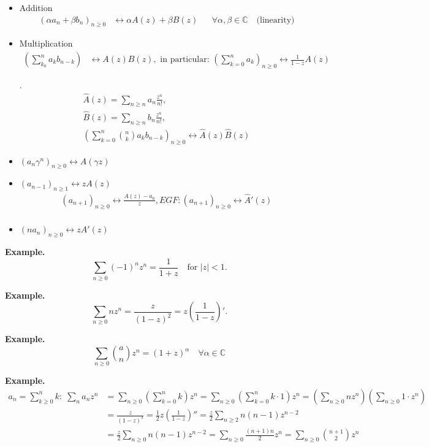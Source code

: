 \begin{itemize}
\item Addition
\begin{align*}
    (\alpha a_n + \beta b_n)_{n≥0}
        &\leftrightarrow \alpha A(z) + \beta B(z)
        &&\forall \alpha, \beta \in \mathbb{C}
        \quad\text{(linearity)}
\end{align*}
\item Multiplication
\begin{align*}
    \left(\sum_{k_0}^{n} a_k b_{n-k} \right)
        &\leftrightarrow A(z) B(z),
        \text{ in particular: }
        \left(\sum_{k=0}^n a_k\right)_{n≥0} \leftrightarrow \frac{1}{1-z} A(z)
\end{align*}

\Remark.
\begin{align*}
    \hat{A}(z) = \sum_{n \geq n} a_n \frac{z^n}{n!}, \\
    \hat{B}(z) = \sum_{n \geq n} b_n \frac{z^n}{n!}, \\
    \left(\sum_{k=0}^n \binom{n}{ k} a_k b_{n-k}\right)_{n \geq 0}
        \leftrightarrow \hat A(z)\hat B(z)
\end{align*}

\item $
    (a_n \gamma^n)_{n≥0}
        ↔ A(\gamma z) $
\item $ (a_{n-1})_{n≥1}↔ z A(z)$
\begin{align*}
        (a_{n+1})_{n≥0} ↔ \frac{A(z)-a_0}z,
        EGF: (a_{n+1})_{n≥0} ↔ \hat A'(z) \\
\end{align*}
\item $(n a_n)_{n≥0}↔ z A'(z)$

\end{itemize}

\textbf{Example.}
\[
    \sum_{n≥0} (-1)^n z^n
    = \frac{1}{1+z} \quad\text{for $|z| < 1$}.
\]

\textbf{Example.}
\[
    \sum_{n≥0} n z^n
    = \frac{z}{(1-z)^2}
    = z \left(\frac1{1-z}\right)'.
\]

\textbf{Example.}
\[
    \sum_{n≥0} \binom{a}{n} z^n
    = (1+z)^\alpha
    \quad\forall\alpha\in\mathbb{C}
\]

\textbf{Example.}
\begin{align*}
    a_n = \sum_{k≥0}^n k:\;
    \sum_n a_n z^n
    &= \sum_{n≥0}
        \left(\sum_{k=0}^n k\right) z^n
    = \sum_{n≥0} \left(\sum_{k=0}^n  k\cdot 1\right) z^n
        = \left( \sum_{n≥0} n z^n \right) \left( \sum_{n≥0} 1 \cdot z^n \right)\\
    &= \frac{z}{(1-z)^3}
    = \frac12 z \left(\frac{1}{1-z}\right)''
    = \frac z2 \sum_{n≥2} n(n-1) z^{n-2}\\
    &= \frac z2 \sum_{n≥0} n(n-1) z^{n-2}
    = \sum_{n≥0} \frac{(n+1)n}{2} z^n
    = \sum_{n≥0} {\binom{n+1}{2}} z^n
\end{align*}

